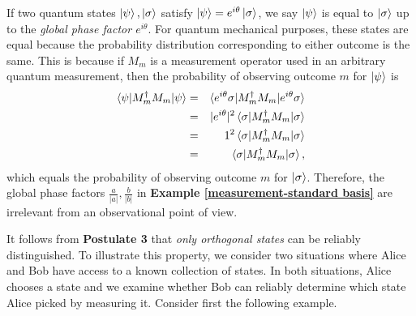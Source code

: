 If two quantum states $\ket{\psi}, \ket{\sigma}$ satisfy $\ket{\psi}=e^{i\theta}\ket{\sigma}$, we say $\ket{\psi}$ is equal to $\ket{\sigma}$ up to the \textit{global phase factor $e^{i\theta}$}. For quantum mechanical purposes, these states are equal because the probability distribution corresponding to either outcome is the same. This is because if $M_m$ is a measurement operator used in an arbitrary quantum measurement, then the probability of observing outcome $m$ for $\ket{\psi}$ is 
\begin{eqnarray}
\braket{\psi|M_m^\dagger M_m|\psi} &=& \braket{e^{i\theta}\sigma|M_m^\dagger M_m|e^{i\theta} \sigma} \\
&=& |e^{i\theta}|^2\braket{\sigma|M_m^\dagger M_m| \sigma} \\
&=& 1^2\braket{\sigma|M_m^\dagger M_m| \sigma} \\
&=& \braket{\sigma|M_m^\dagger M_m| \sigma} ,
\end{eqnarray}
which equals the probability of observing outcome $m$ for $\ket{\sigma}$.  Therefore, the global phase factors $\frac{a}{|a|}, \frac{b}{|b|}$ in \textbf{Example \ref{measurement-standard basis}} are irrelevant from an observational point of view.

\bigskip
It follows from {\bf{Postulate 3}} that {\emph{only orthogonal states}} can be reliably distinguished. To illustrate this property, we consider two situations where Alice and Bob have access to a known collection of states.  In both situations, Alice chooses a state and we examine whether Bob can reliably determine which state Alice picked by measuring it.  Consider first the following example.

